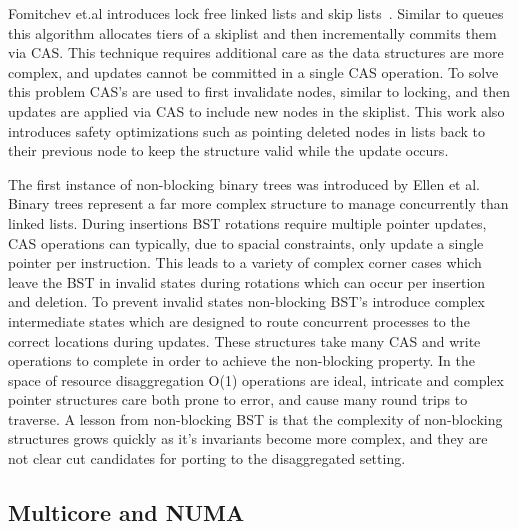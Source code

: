 Fomitchev et.al introduces lock free linked lists and skip
lists~\cite{lock-free-skip}. Similar to queues this algorithm allocates tiers of
a skiplist and then incrementally commits them via CAS. This technique requires
additional care as the data structures are more complex, and updates cannot be
committed in a single CAS operation. To solve this problem CAS's are used to
first invalidate nodes, similar to locking, and then updates are applied via CAS
to include new nodes in the skiplist. This work also introduces safety
optimizations such as pointing deleted nodes in lists back to their previous
node to keep the structure valid while the update occurs.

The first instance of non-blocking binary trees was introduced by Ellen et al.
Binary trees represent a far more complex structure to manage concurrently than
linked lists. During insertions BST rotations require multiple pointer updates,
CAS operations can typically, due to spacial constraints, only update a single
pointer per instruction. This leads to a variety of complex corner cases which
leave the BST in invalid states during rotations which can occur per insertion
and deletion. To prevent invalid states non-blocking BST's introduce complex
intermediate states which are designed to route concurrent processes to the
correct locations during updates. These structures take many CAS and write
operations to complete in order to achieve the non-blocking property. In the
space of resource disaggregation O(1) operations are ideal, intricate and
complex pointer structures care both prone to error, and cause many round trips
to traverse. A lesson from non-blocking BST is that the complexity of
non-blocking structures grows quickly as it's invariants become more complex,
and they are not clear cut candidates for porting to the disaggregated setting.


\subsection{Multicore and NUMA}

